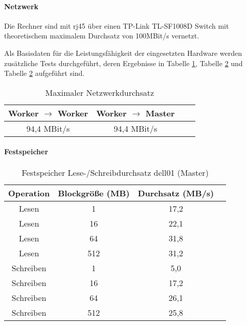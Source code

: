 \paragraph{Netzwerk} \newline
Die Rechner sind mit \gls{rj45} über einen TP-Link TL-SF1008D Switch mit theoretischem maximalem Durchsatz von 100MBit/s vernetzt.

Als Basisdaten für die Leistungsfähigkeit der eingesetzten Hardware werden zusätzliche Tests durchgeführt, deren Ergebnisse in Tabelle \ref{table:network}, Tabelle \ref{table:master_harddrive} und Tabelle \ref{table:master_harddrive} aufgeführt sind.

\begin{table}[ht]
	\centering %
	\begin{tabular}{c c c c} %
	\hline\hline %
	Worker $\rightarrow$ Worker & Worker $\rightarrow$ Master \\ [0.5ex] %
	\hline %
	94,4 MBit/s & 94,4 MBit/s\\ [1ex] 
	\hline %
	\end{tabular}
	\caption{Maximaler Netzwerkdurchsatz{\protect\footnotemark}} %
	\label{table:network} %
\end{table}

\paragraph{Festspeicher}

\begin{table}[ht]
	\centering %
	\begin{tabular}{c c c c} %
	\hline\hline %
	Operation & Blockgröße (MB) & Durchsatz (MB/s) \\ [0.5ex] %
	\hline %
	Lesen & 1 & 17,2 \\ 
	Lesen & 16 & 22,1 \\
	Lesen & 64 & 31,8 \\
	Lesen & 512 & 31,2 \\
	Schreiben & 1 & 5,0 \\
	Schreiben & 16 & 17,2 \\
	Schreiben & 64 & 26,1 \\
	Schreiben & 512 & 25,8 \\[1ex] 
	\hline %
	\end{tabular}
	\caption{Festspeicher Lese-/Schreibdurchsatz dell01 (Master){\protect\footnotemark}} %
	\label{table:master_harddrive} %
\end{table}


